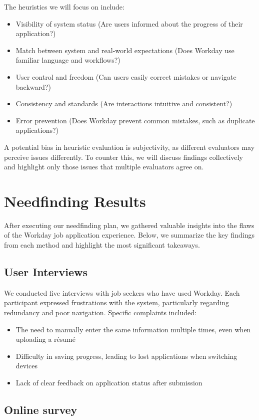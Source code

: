 \documentclass[
	letterpaper, %
]{jdf}
\begin{document}
\begin{sloppypar}
The heuristics we will focus on include:
\begin{itemize}
    \item Visibility of system status (Are users informed about the progress of their application?)
    \item Match between system and real-world expectations (Does Workday use familiar language and workflows?)
    \item User control and freedom (Can users easily correct mistakes or navigate backward?)
    \item Consistency and standards (Are interactions intuitive and consistent?)
    \item Error prevention (Does Workday prevent common mistakes, such as duplicate applications?)
\end{itemize}
A potential bias in heuristic evaluation is subjectivity, as different evaluators may perceive issues differently. To counter this, we will discuss findings collectively and highlight only those issues that multiple evaluators agree on.

\hfill \break
\newpage
\section{Needfinding Results }
After executing our needfinding plan, we gathered valuable insights into the flaws of the Workday job application experience. Below, we summarize the key findings from each method and highlight the most significant takeaways.

\subsection{User Interviews}
We conducted five interviews with job seekers who have used Workday. Each participant expressed frustrations with the system, particularly regarding redundancy and poor navigation. Specific complaints included:
\begin{itemize}
    \item The need to manually enter the same information multiple times, even when uploading a résumé
    \item Difficulty in saving progress, leading to lost applications when switching devices
    \item Lack of clear feedback on application status after submission
\end{itemize}
\hfill \break

\subsection{Online survey}


\end{sloppypar}
\end{document}
